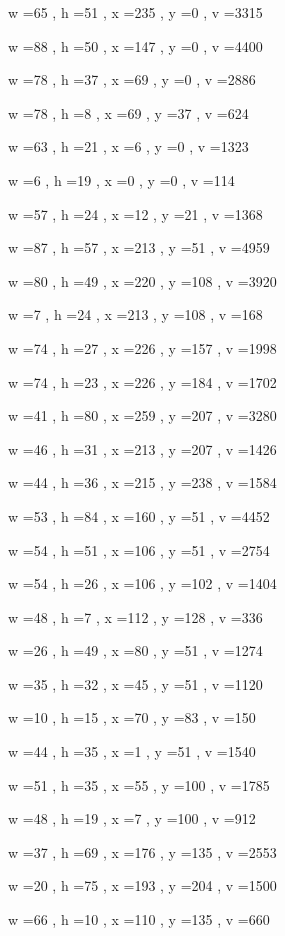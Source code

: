 \documentclass[11pt]{article}
\begin{document}
w =65 , h =51 , x =235 , y =0 , v =3315
\par
w =88 , h =50 , x =147 , y =0 , v =4400
\par
w =78 , h =37 , x =69 , y =0 , v =2886
\par
w =78 , h =8 , x =69 , y =37 , v =624
\par
w =63 , h =21 , x =6 , y =0 , v =1323
\par
w =6 , h =19 , x =0 , y =0 , v =114
\par
w =57 , h =24 , x =12 , y =21 , v =1368
\par
w =87 , h =57 , x =213 , y =51 , v =4959
\par
w =80 , h =49 , x =220 , y =108 , v =3920
\par
w =7 , h =24 , x =213 , y =108 , v =168
\par
w =74 , h =27 , x =226 , y =157 , v =1998
\par
w =74 , h =23 , x =226 , y =184 , v =1702
\par
w =41 , h =80 , x =259 , y =207 , v =3280
\par
w =46 , h =31 , x =213 , y =207 , v =1426
\par
w =44 , h =36 , x =215 , y =238 , v =1584
\par
w =53 , h =84 , x =160 , y =51 , v =4452
\par
w =54 , h =51 , x =106 , y =51 , v =2754
\par
w =54 , h =26 , x =106 , y =102 , v =1404
\par
w =48 , h =7 , x =112 , y =128 , v =336
\par
w =26 , h =49 , x =80 , y =51 , v =1274
\par
w =35 , h =32 , x =45 , y =51 , v =1120
\par
w =10 , h =15 , x =70 , y =83 , v =150
\par
w =44 , h =35 , x =1 , y =51 , v =1540
\par
w =51 , h =35 , x =55 , y =100 , v =1785
\par
w =48 , h =19 , x =7 , y =100 , v =912
\par
w =37 , h =69 , x =176 , y =135 , v =2553
\par
w =20 , h =75 , x =193 , y =204 , v =1500
\par
w =66 , h =10 , x =110 , y =135 , v =660
\par
\newpage
\end{document}
